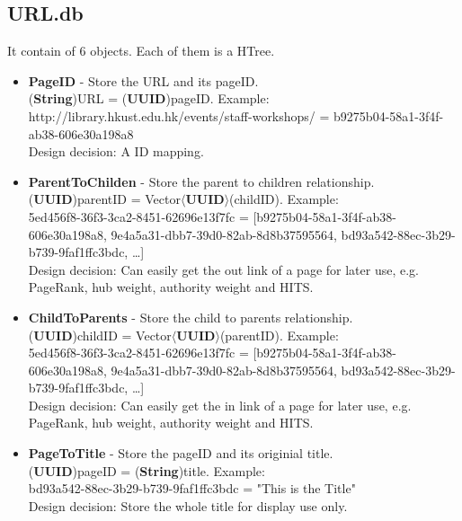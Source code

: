 \documentclass{article}
\begin{document}
    \subsection*{URL.db}
    It contain of 6 objects. Each of them is a HTree.
    \begin{itemize}
        \item \textbf{PageID} - Store the URL and its pageID. \\[0.4em]
        (\textbf{String})URL = (\textbf{UUID})pageID. Example:\\[0.4em]
        http://library.hkust.edu.hk/events/staff-workshops/ = b9275b04-58a1-3f4f-ab38-606e30a198a8 \\[0.4em]
        Design decision: A ID mapping. 

        \item \textbf{ParentToChilden} - Store the parent to children relationship. \\[0.4em]
        (\textbf{UUID})parentID = Vector$\langle$\textbf{UUID}$\rangle$(childID). Example:\\[0.4em]
        5ed456f8-36f3-3ca2-8451-62696e13f7fc = [b9275b04-58a1-3f4f-ab38-606e30a198a8, 9e4a5a31-dbb7-39d0-82ab-8d8b37595564, bd93a542-88ec-3b29-b739-9faf1ffc3bdc, \dots] \\[0.4em]
        Design decision: Can easily get the out link of a page for later use, e.g. PageRank, hub weight, authority weight and HITS.
        
        \item \textbf{ChildToParents} - Store the child to parents relationship. \\[0.4em]
        (\textbf{UUID})childID = Vector$\langle$\textbf{UUID}$\rangle$(parentID). Example:\\[0.4em]
        5ed456f8-36f3-3ca2-8451-62696e13f7fc = [b9275b04-58a1-3f4f-ab38-606e30a198a8, 9e4a5a31-dbb7-39d0-82ab-8d8b37595564, bd93a542-88ec-3b29-b739-9faf1ffc3bdc, \dots] \\[0.4em]
        Design decision: Can easily get the in link of a page for later use, e.g. PageRank, hub weight, authority weight and HITS.

        \item \textbf{PageToTitle} - Store the pageID and its originial title. \\[0.4em]
        (\textbf{UUID})pageID = (\textbf{String})title. Example:\\[0.4em]
        bd93a542-88ec-3b29-b739-9faf1ffc3bdc = "This is the Title"\\[0.4em]
        Design decision: Store the whole title for display use only.


\end{itemize}
\end{document}
